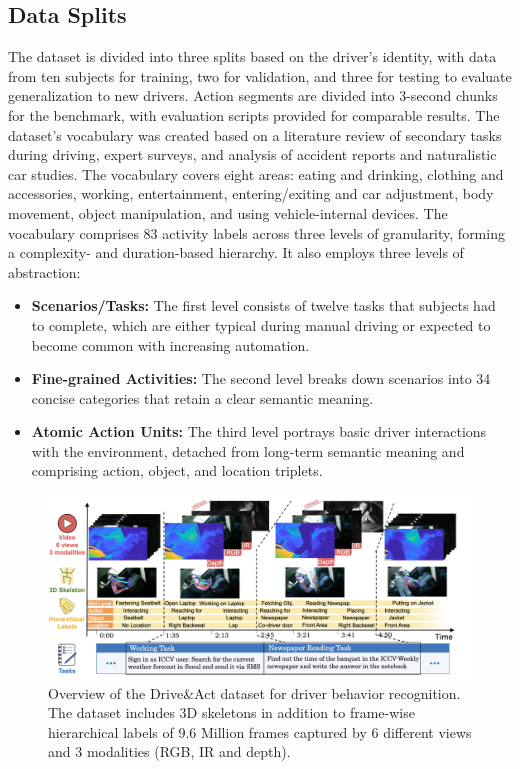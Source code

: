 \documentclass{article}
\begin{document}
\subsection{Data Splits}
The dataset is divided into three splits based on the driver's identity, with data from ten subjects for training, two for validation, and three for testing to evaluate generalization to new drivers. Action segments are divided into 3-second chunks for the benchmark, with evaluation scripts provided for comparable results.
The dataset's vocabulary was created based on a literature review of secondary tasks during driving, expert surveys, and analysis of accident reports and naturalistic car studies. The vocabulary covers eight areas: eating and drinking, clothing and accessories, working, entertainment, entering/exiting and car adjustment, body movement, object manipulation, and using vehicle-internal devices. The vocabulary comprises 83 activity labels across three levels of granularity, forming a complexity- and duration-based hierarchy. It also employs three levels of abstraction:
\begin{itemize}
    \item \textbf{Scenarios/Tasks:} The first level consists of twelve tasks that subjects had to complete, which are either typical during manual driving or expected to become common with increasing automation.
    \item \textbf{Fine-grained Activities:} The second level breaks down scenarios into 34 concise categories that retain a clear semantic meaning.
    \item \textbf{Atomic Action Units:} The third level portrays basic driver interactions with the environment, detached from long-term semantic meaning and comprising action, object, and location triplets.
\end{itemize}
\begin{figure}
    \centering
    \includegraphics[width=1\linewidth]{figs/drive_and_act.png}
    \caption{Overview of the Drive\&Act dataset for driver behavior recognition. The dataset includes 3D skeletons in addition
to frame-wise hierarchical labels of 9.6 Million frames captured by 6 different views and 3 modalities (RGB, IR and depth). \cite{drive_and_act_2019_iccv}}
    \label{fig:drive-and-act}
\end{figure}
\end{document}
